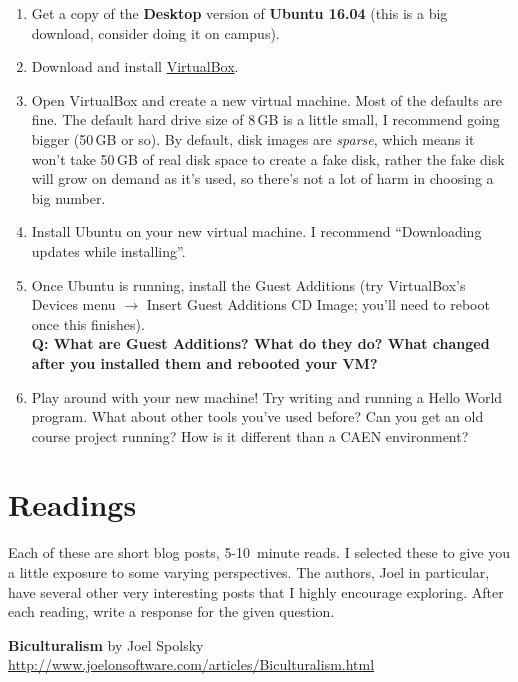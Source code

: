 \documentclass{article}
\begin{document}
\medskip

\begin{enumerate}
  \item Get a copy of the \textbf{Desktop} version of \textbf{Ubuntu 16.04}
    (this is a big download, consider doing it on campus).
  \item Download and install \href{https://www.virtualbox.org}{VirtualBox}.
  \item Open VirtualBox and create a new virtual machine. Most of the defaults
    are fine. The default hard drive size of 8\,GB is a little small, I
    recommend going bigger (50\,GB or so). By default, disk images are
    \emph{sparse}, which means it won't take 50\,GB of real disk space to
    create a fake disk, rather the fake disk will grow on demand as it's used,
    so there's not a lot of harm in choosing a big number.
  \item Install Ubuntu on your new virtual machine. I recommend ``Downloading
    updates while installing''.
  \item Once Ubuntu is running, install the Guest Additions (try VirtualBox's
    Devices menu $\rightarrow$ Insert Guest Additions CD Image; you'll need to
    reboot once this finishes).
    \\
    \textbf{Q: What are Guest Additions? What do they do? What changed after
    you installed them and rebooted your VM?}
    \vspace{3.5cm}
  \item Play around with your new machine! Try writing and running a Hello
    World program. What about other tools you've used before? Can you get an
    old course project running? How is it different than a CAEN environment?
\end{enumerate}


\newpage
\section{Readings}

Each of these are short blog posts, 5-10~minute reads. I selected these to
give you a little exposure to some varying perspectives. The authors, Joel in
particular, have several other very interesting posts that I highly encourage
exploring. After each reading, write a response for the given question.

\medskip

\noindent
\textbf{Biculturalism} by Joel Spolsky\\
\url{http://www.joelonsoftware.com/articles/Biculturalism.html}\\
\end{document}

